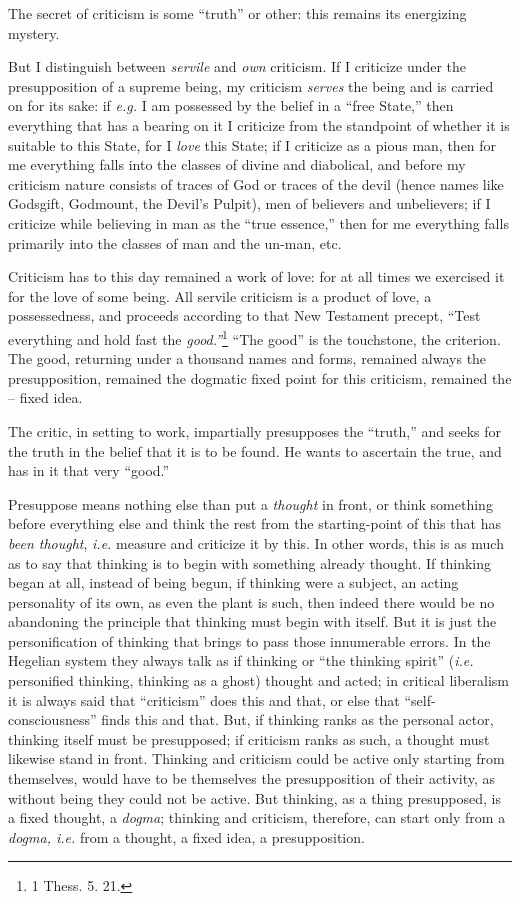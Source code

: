 The secret of criticism is some ``truth'' or other: this remains its 
energizing mystery.

But I distinguish between \textit{servile} and \textit{own} criticism. If I 
criticize under the presupposition of a supreme being, my criticism 
\textit{serves} the being and is carried on for its sake: if \textit{e.g.} I 
am possessed by the belief in a ``free State,'' then everything that has a 
bearing on it I criticize from the standpoint of whether it is suitable to 
this State, for I \textit{love} this State; if I criticize as a pious man, 
then for me everything falls into the classes of divine and diabolical, and 
before my criticism nature consists of traces of God or traces of the devil 
(hence names like Godsgift, Godmount, the Devil's Pulpit), men of believers 
and unbelievers; if I criticize while believing in man as the ``true 
essence,'' then for me everything falls primarily into the classes of man and 
the un-man, etc.

Criticism has to this day remained a work of love: for at all times we 
exercised it for the love of some being. All servile criticism is a product of 
love, a possessedness, and proceeds according to that New Testament precept, 
``Test everything and hold fast the \textit{good.''}\footnote{1 Thess. 5. 
21.} ``The good'' is the touchstone, the criterion. The good, returning 
under a thousand names and forms, remained always the presupposition, remained 
the dogmatic fixed point for this criticism, remained the -- fixed idea.

The critic, in setting to work, impartially presupposes the ``truth,'' and 
seeks for the truth in the belief that it is to be found. He wants to 
ascertain the true, and has in it that very ``good.''

Presuppose means nothing else than put a \textit{thought} in front, or think 
something before everything else and think the rest from the starting-point of 
this that has \textit{been thought}, \textit{i.e.} measure and criticize it by 
this. In other words, this is as much as to say that thinking is to begin with 
something already thought. If thinking began at all, instead of being begun, 
if thinking were a subject, an acting personality of its own, as even the 
plant is such, then indeed there would be no abandoning the principle that 
thinking must begin with itself. But it is just the personification of 
thinking that brings to pass those innumerable errors. In the Hegelian system 
they always talk as if thinking or ``the thinking spirit'' (\textit{i.e.} 
personified thinking, thinking as a ghost) thought and acted; in critical 
liberalism it is always said that ``criticism'' does this and that, or else 
that ``self- consciousness'' finds this and that. But, if thinking ranks as 
the personal actor, thinking itself must be presupposed; if criticism ranks as 
such, a thought must likewise stand in front. Thinking and criticism could be 
active only starting from themselves, would have to be themselves the 
presupposition of their activity, as without being they could not be active. 
But thinking, as a thing presupposed, is a fixed thought, a \textit{dogma}; 
thinking and criticism, therefore, can start only from a \textit{dogma, i.e.} 
from a thought, a fixed idea, a presupposition.

